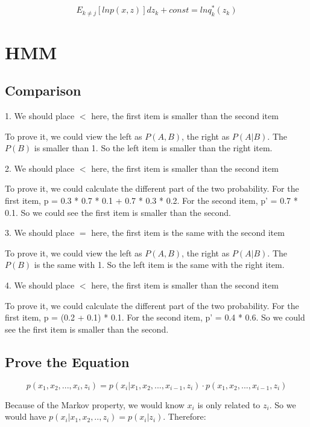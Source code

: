 \documentclass{article} %
\begin{document}
\begin{equation}
E_{k \neq j} [ ln p (x,z) ] dz_k + const =
ln q_k^* (z_k)
\end{equation}



\section{HMM}

\subsection{Comparison}

1. We should place $<$ here, the first item is smaller than the second item

To prove it, we could view the left as $P(A,B)$, the right as $P(A | B)$. The
$P(B)$ is smaller than 1. So the left item is smaller than the right item.

2. We should place $<$ here, the first item is smaller than the second item

To prove it, we could calculate the different part of the two probability. For
the first item, p = 0.3 * 0.7 * 0.1 + 0.7 * 0.3 * 0.2. For the second item,
p' = 0.7 * 0.1. So we could see the first item is smaller than the second.

3. We should place $=$ here, the first item is the same with the second item

To prove it, we could view the left as $P(A,B)$, the right as $P(A | B)$. The
$P(B)$ is the same with 1. So the left item is the same with the right item.

4. We should place $<$ here, the first item is smaller than the second item

To prove it, we could calculate the different part of the two probability. For
the first item, p = (0.2 + 0.1) * 0.1. For the second item, p' = 0.4 * 0.6.
So we could see the first item is smaller than the second.


\subsection{Prove the Equation}

\begin{equation}
p (x_1, x_2, ..., x_i, z_i) = p (x_i | x_1, x_2, ..., x_{i-1}, z_i)
\cdot p (x_1, x_2, ..., x_{i-1}, z_i)
\end{equation}

Because of the Markov property, we would know $x_i$ is only related to $z_i$.
So we would have $p (x_i | x_1, x_2 ,.., z_i) = p (x_i | z_i)$. Therefore:
\end{document}
